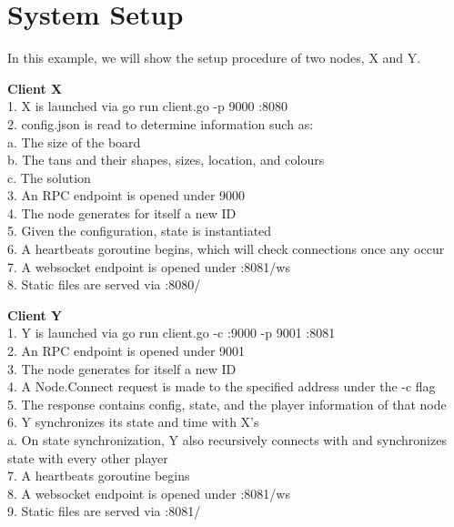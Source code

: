 \documentclass[twocolumn]{article}
\begin{document}
\section{System Setup}
\begin{flushleft}
In this example, we will show the setup procedure of two nodes, X and Y.

\textbf{Client X}\\
1. X is launched via go run client.go -p 9000 :8080\\
2. config.json is read to determine information such as:\\
\hspace*{1em}a. The size of the board\\
\hspace*{1em}b. The tans and their shapes, sizes, location, and colours\\
\hspace*{1em}c. The solution\\
3. An RPC endpoint is opened under 9000\\
4. The node generates for itself a new ID\\
5. Given the configuration, state is instantiated\\
6. A heartbeats goroutine begins, which will check connections once any occur\\
7. A websocket endpoint is opened under :8081/ws\\
8. Static files are served via :8080/

\textbf{Client Y}\\
1. Y is launched via go run client.go -c :9000 -p 9001 :8081\\
2. An RPC endpoint is opened under 9001\\
3. The node generates for itself a new ID\\
4. A Node.Connect request is made to the specified address under the -c flag\\
5. The response contains config, state, and the player information of that node\\
6. Y synchronizes its state and time with X’s\\
\hspace*{1em}a. On state synchronization, Y also recursively connects with and synchronizes state with every other player\\
7. A heartbeats goroutine begins\\
8. A websocket endpoint is opened under :8081/ws\\
9. Static files are served via :8081/
\end{flushleft}
\end{document}
